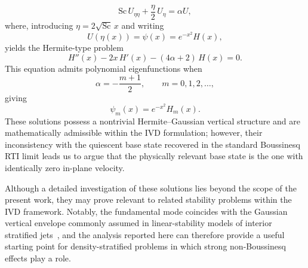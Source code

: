 \documentclass[11pt]{article}
\newcommand{\Sch}{\mathrm{Sc}}
\begin{document}
\begin{equation}
    \Sch\,U_{\eta\eta} + \frac{\eta}{2}\,U_{\eta} = \alpha U,
\end{equation}
where, introducing \(\eta = 2\sqrt{\Sch}\,x\) and writing
\begin{equation}
    U(\eta(x)) = \psi(x) = e^{-x^2} H(x),
\end{equation}
yields the Hermite-type problem
\begin{equation}
    H''(x) - 2x\,H'(x) - (4\alpha + 2)\,H(x) = 0.
\end{equation}
This equation admits polynomial eigenfunctions when
\begin{equation}
    \alpha = -\frac{m+1}{2}, \qquad m = 0,1,2,\dots,
\end{equation}
giving
\begin{equation}
    \psi_m(x) = e^{-x^2} H_m(x).
\end{equation}
These solutions possess a nontrivial Hermite--Gaussian vertical structure and are mathematically admissible within the IVD formulation; however, their inconsistency with the quiescent base state recovered in the standard Boussinesq RTI limit leads us to argue that the physically relevant base state is the one with identically zero in-plane velocity.

Although a detailed investigation of these solutions lies beyond the scope of the present work, they may prove relevant to related stability problems within the IVD framework. Notably, the fundamental mode coincides with the Gaussian vertical envelope commonly assumed in linear-stability models of interior stratified jets~\citep{harris-poulin-lamb-2022}, and the analysis reported here can therefore provide a useful starting point for density-stratified problems in which strong
non-Boussinesq effects play a role.
\end{document}

